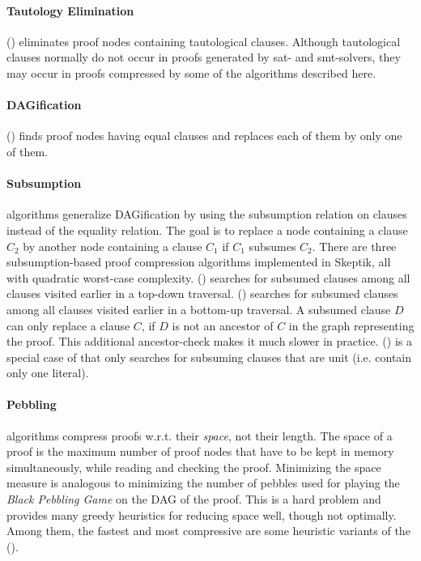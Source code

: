 \documentclass{llncs}
\begin{document}
\paragraph{Tautology Elimination} () eliminates proof nodes containing tautological clauses. Although tautological clauses normally do not occur in proofs generated by sat- and smt-solvers, they may occur in proofs compressed by some of the algorithms described here.


\paragraph{DAGification} () finds proof nodes having equal clauses and replaces each of them by only one of them. 


\paragraph{Subsumption} algorithms generalize DAGification by using the subsumption relation on clauses instead of the equality relation. 
The goal is to replace a node containing a clause $C_2$ by another node containing a clause $C_1$ if $C_1$ subsumes $C_2$.
There are three subsumption-based proof compression algorithms implemented in Skeptik, all with quadratic worst-case complexity.
%
 () searches for subsumed clauses among all clauses visited earlier in a top-down traversal. 
%
 () searches for subsumed clauses among all clauses visited earlier in a bottom-up traversal. A subsumed clause $D$ can only replace a clause $C$, if $D$ is not an ancestor of $C$ in the graph representing the proof. This additional ancestor-check makes it much slower in practice.
%
 () \cite{RP11} is a special case of  that only searches for subsuming clauses that are unit (i.e. contain only one literal).

\paragraph{Pebbling} algorithms 
compress proofs w.r.t. their \emph{space}, not their length. The space of a proof is the maximum number of proof nodes that have to be kept in memory simultaneously, while reading and checking the proof.
Minimizing the space measure is analogous to minimizing the number of pebbles used for playing the \emph{Black Pebbling Game} \cite{gilbert1980pebbling} on the DAG of the proof. This is a hard problem and {\skeptik} provides many greedy heuristics for reducing space well, though not optimally. Among them, the fastest and most compressive are some heuristic variants of the
 ().
\end{document}
